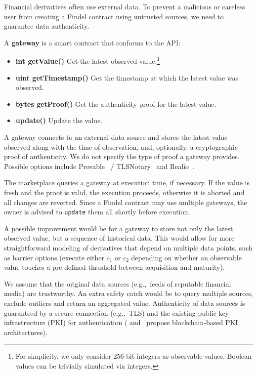 Financial derivatives often use external data.
To prevent a malicious or careless user from creating a Findel contract using untrusted sources, we need to guarantee data authenticity.

\begin{definition}
	A \textbf{gateway} is a smart contract that conforms to the API:
	
	\begin{itemize}
		\item \textbf{int getValue()} Get the latest observed value.\footnote{For simplicity, we only consider 256-bit integers as observable values. Boolean values can be trivially simulated via integers.}
		\item \textbf{uint getTimestamp()} Get the timestamp at which the latest value was observed.
		\item \textbf{bytes getProof()} Get the authenticity proof for the latest value.
		\item \textbf{update()} Update the value.
	\end{itemize}
	
\end{definition}

A gateway connects to an external data source and stores the latest value observed along with the time of observation, and, optionally, a cryptographic proof of authenticity.
We do not specify the type of proof a gateway provides.
Possible options include Provable~\cite{Provable} / TLSNotary~\cite{TLSNotary} and Realio~\cite{Realitio}.

The marketplace queries a gateway at execution time, if necessary. 
If the value is fresh and the proof is valid, the execution proceeds, otherwise it is aborted and all changes are reverted.
Since a Findel contract may use multiple gateways, the owner is advised to \texttt{update} them all shortly before execution.

A possible improvement would be for a gateway to store not only the latest observed value, but a sequence of historical data.
This would allow for more straightforward modeling of derivatives that depend on multiple data points, such as barrier options (execute either \(c_1\) or \(c_2\) depending on whether an observable value touches a pre-defined threshold between acquisition and maturity).

We assume that the original data sources (e.g.,~feeds of reputable financial media) are trustworthy.
An extra safety catch would be to query multiple sources, exclude outliers and return an aggregated value.
Authenticity of data sources is guaranteed by a secure connection (e.g.,~TLS) and the existing public key infrastructure (PKI) for authentication (\cite{Fromknecht2014} and~\cite{Lewison2016} propose blockchain-based PKI architectures).

